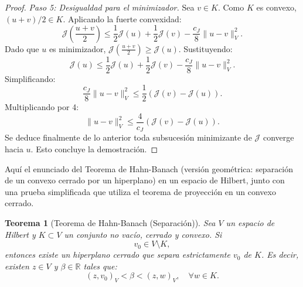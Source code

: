 \documentclass[12pt]{book}
\newtheorem{theorem}{Teorema}
\theoremstyle{definition}
\theoremstyle{plain}
\theoremstyle{remark}
\begin{document}
\begin{proof}
\medskip

    \emph{Paso 5: Desigualdad para el minimizador.}
    Sea \(v \in K\). Como \(K\) es convexo, \({(u + v)}/{2} \in K\). Aplicando la fuerte convexidad:
    \[
    \mathcal{J}\left(\frac{u + v}{2}\right) \leq \frac{1}{2} \mathcal{J}(u) + \frac{1}{2} \mathcal{J}(v) - \frac{c_J}{8} \| u - v \|^2_V.
    \]
    Dado que \(u\) es minimizador, \(\mathcal{J}\left(\frac{u + v}{2}\right) \geq \mathcal{J}(u)\). Sustituyendo:
    \[
    \mathcal{J}(u) \leq \frac{1}{2} \mathcal{J}(u) + \frac{1}{2} \mathcal{J}(v) - \frac{c_J}{8} \| u - v \|^2_V.
    \]
    Simplificando:
    \[
    \frac{c_J}{8} \| u - v \|_V^2 \leq \frac{1}{2} \left( \mathcal{J}(v) - \mathcal{J}(u) \right).
    \]
    Multiplicando por 4:
    \[
    \| u - v \|^2_V \leq \frac{4}{c_J} \left( \mathcal{J}(v) - \mathcal{J}(u) \right).
    \]
%
Se deduce finalmente de lo anterior toda subsucesión minimizante de \(\mathcal{J}\) converge hacia \(u\).
%
    Esto concluye la demostración. 
\end{proof}

Aquí el enunciado del Teorema de Hahn-Banach (versión geométrica: separación de un convexo cerrado por un hiperplano) en un espacio de Hilbert, junto con una prueba simplificada que utiliza el teorema de proyección en un convexo cerrado. 

\begin{theorem}[Teorema de Hahn-Banach (Separación)]
    Sea \(V\) un espacio de Hilbert y \(K \subset V\) un conjunto no vacío, cerrado y convexo. Si \[v_0 \in V \setminus K,\] entonces existe un hiperplano cerrado que separa estrictamente \(v_0\) de \(K\). Es decir, existen \(z \in V\) y \(\beta \in \mathbb{R}\) tales que:
    \[
    (z,v_0)_V
    < \beta < 
    (z,w)_V, \quad \forall w \in K.
    \]
\end{theorem}
\end{document}
